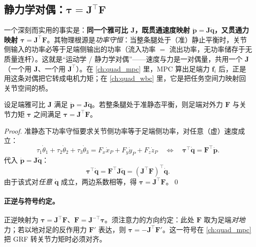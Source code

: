 \subsection{静力学对偶：$\boldsymbol{\tau}=\mathbf{J}^\top\mathbf{F}$}
\label{subsec:qk-statics}

\begin{insight}\label{ins:qk-duality}
一个深刻而实用的事实是：\textbf{同一个雅可比 $\mathbf{J}$，既贯通速度映射 $\dot{\boldsymbol{p}}=\mathbf{J}\dot{\boldsymbol{q}}$，又贯通力映射 $\boldsymbol{\tau}=\mathbf{J}^\top\mathbf{F}$}。其物理根源是\emph{功率守恒}：当整条腿处于（准）静止平衡时，关节侧输入的功率必等于足端侧输出的功率（流入功率 $=$ 流出功率，无功率储存于无质量连杆）\cite{unitree2023quadruped}。这就是“运动学 / 静力学对偶”——速度与力是一对偶量，共用一个 $\mathbf{J}$（一个用 $\mathbf{J}$、一个用 $\mathbf{J}^\top$）。在 \cref{ch:quad_mpc} 里，MPC 算出足端力 $\mathbf{f}_i$ 后，正是用这条对偶把它转成电机力矩；在 \cref{ch:quad_wbc} 里，它是把任务空间力映射回关节空间的桥。
\end{insight}

\begin{theorem}\label{thm:qk-duality}
设足端雅可比 $\mathbf{J}$ 满足 $\dot{\boldsymbol{p}}=\mathbf{J}\dot{\boldsymbol{q}}$。若整条腿处于准静态平衡，则足端对外力 $\mathbf{F}$ 与关节力矩 $\boldsymbol{\tau}$ 之间满足 $\boldsymbol{\tau}=\mathbf{J}^\top\mathbf{F}$。
\end{theorem}
\begin{proof}
准静态下功率守恒要求关节侧功率等于足端侧功率，对任意（虚）速度成立\cite{unitree2023quadruped}：
\begin{equation}
  \tau_1\dot\theta_1+\tau_2\dot\theta_2+\tau_3\dot\theta_3
  =F_x\dot x_P+F_y\dot y_P+F_z\dot z_P
  \quad\Longleftrightarrow\quad
  \boldsymbol{\tau}^\top\dot{\boldsymbol{q}}=\mathbf{F}^\top\dot{\boldsymbol{p}}.
  \label{eq:qk-power-balance}
\end{equation}
代入 $\dot{\boldsymbol{p}}=\mathbf{J}\dot{\boldsymbol{q}}$：
\[
  \boldsymbol{\tau}^\top\dot{\boldsymbol{q}}=\mathbf{F}^\top\mathbf{J}\dot{\boldsymbol{q}}
  =(\mathbf{J}^\top\mathbf{F})^\top\dot{\boldsymbol{q}}.
\]
由于该式对\emph{任意} $\dot{\boldsymbol{q}}$ 成立，两边系数相等，得 $\boldsymbol{\tau}=\mathbf{J}^\top\mathbf{F}$。\qed
\end{proof}

\paragraph{正逆与符号约定。}
正逆映射为 $\boldsymbol{\tau}=\mathbf{J}^\top\mathbf{F}$、$\mathbf{F}=\mathbf{J}^{-\top}\boldsymbol{\tau}$。须注意力的方向约定：此处 $\mathbf{F}$ 取为足端\emph{对地}力；若以地对足的反作用力 $\mathbf{F}'$ 表达，则 $\boldsymbol{\tau}=-\mathbf{J}^\top\mathbf{F}'$\cite{unitree2023quadruped}。这一符号在 \cref{ch:quad_mpc} 把 GRF 转关节力矩时必须对齐。

